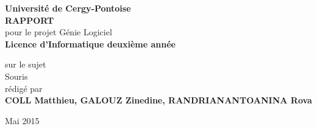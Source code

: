 
\begin{titlepage}{
 \begin{center}
        \vspace* {25mm}
        {\Large \textbf {Universit\'e de Cergy-Pontoise}} \\
        \vspace* {10mm}
        {\Large \textbf {RAPPORT}} \\
        \vspace* {10mm}
        pour le projet G\'enie Logiciel \\
        \textbf {Licence d'Informatique deuxi\`eme ann\'ee} \\
        \vspace* {10mm}

	sur le sujet \\
        \vspace* {10mm}
	{\Huge \textsf{Souris}} \\
        \vspace* {10mm}
 	r\'edig\'e par \\
        \vspace* {10mm}
        {\Large \textbf {COLL Matthieu, GALOUZ Zinedine, RANDRIANANTOANINA Rova}} \\
				\vspace* {10mm}
        \date  mMai 2015
        \vspace* {10mm}
	\end{center}
}
\end{titlepage}
